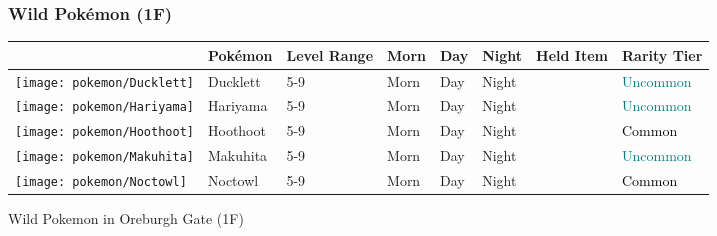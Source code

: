 \subsubsection{Wild Pokémon (1F)}%
\label{ssubsec:WildPokmon(1F)}%
\begin{longtable}{||l l l l l l l l||}%
\hline%
&Pokémon&Level Range&Morn&Day&Night&Held Item&Rarity Tier\\%
\hline%
\endhead%
\hline%
\texttt{[image: pokemon/Ducklett]}&Ducklett&5{-}9&Morn&Day&Night&&\textcolor{teal}{%
Uncommon%
}\\%
\hline%
\texttt{[image: pokemon/Hariyama]}&Hariyama&5{-}9&Morn&Day&Night&&\textcolor{teal}{%
Uncommon%
}\\%
\hline%
\texttt{[image: pokemon/Hoothoot]}&Hoothoot&5{-}9&Morn&Day&Night&&\textcolor{black}{%
Common%
}\\%
\hline%
\texttt{[image: pokemon/Makuhita]}&Makuhita&5{-}9&Morn&Day&Night&&\textcolor{teal}{%
Uncommon%
}\\%
\hline%
\texttt{[image: pokemon/Noctowl]}&Noctowl&5{-}9&Morn&Day&Night&&\textcolor{black}{%
Common%
}\\%
\hline%
\end{longtable}%
\caption{Wild Pokemon in Oreburgh Gate (1F)}